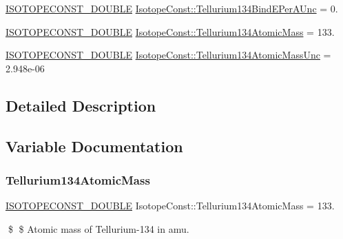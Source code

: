 \begin{DoxyCompactItemize}
\mbox{\hyperlink{group___isotope_const-_macros_ga8f45a7272ce02c0b4c65c44636ed719a}{I\+S\+O\+T\+O\+P\+E\+C\+O\+N\+S\+T\+\_\+\+D\+O\+U\+B\+LE}} \mbox{\hyperlink{group___isotope_const-_tellurium-_te134_gaa8f267539ad4679cb81058860f0d3d57}{Isotope\+Const\+::\+Tellurium134\+Bind\+E\+Per\+A\+Unc}} = 0.
\item 
\mbox{\hyperlink{group___isotope_const-_macros_ga8f45a7272ce02c0b4c65c44636ed719a}{I\+S\+O\+T\+O\+P\+E\+C\+O\+N\+S\+T\+\_\+\+D\+O\+U\+B\+LE}} \mbox{\hyperlink{group___isotope_const-_tellurium-_te134_gae786c89fd5e52adfd981155d974ee502}{Isotope\+Const\+::\+Tellurium134\+Atomic\+Mass}} = 133.
\item 
\mbox{\hyperlink{group___isotope_const-_macros_ga8f45a7272ce02c0b4c65c44636ed719a}{I\+S\+O\+T\+O\+P\+E\+C\+O\+N\+S\+T\+\_\+\+D\+O\+U\+B\+LE}} \mbox{\hyperlink{group___isotope_const-_tellurium-_te134_ga3adbcfa8d69bac630e56ff37b044c3db}{Isotope\+Const\+::\+Tellurium134\+Atomic\+Mass\+Unc}} = 2.\+948e-\/06
\end{DoxyCompactItemize}


\subsection{Detailed Description}


\subsection{Variable Documentation}
\mbox{\label{group___isotope_const-_tellurium-_te134_gae786c89fd5e52adfd981155d974ee502}} 
\subsubsection{\texorpdfstring{Tellurium134\+Atomic\+Mass}{Tellurium134AtomicMass}}
{\footnotesize\ttfamily \mbox{\hyperlink{group___isotope_const-_macros_ga8f45a7272ce02c0b4c65c44636ed719a}{I\+S\+O\+T\+O\+P\+E\+C\+O\+N\+S\+T\+\_\+\+D\+O\+U\+B\+LE}} Isotope\+Const\+::\+Tellurium134\+Atomic\+Mass = 133.}

\$ \$ Atomic mass of Tellurium-\/134 in amu. \mbox{\label{group___isotope_const-_tellurium-_te134_ga3adbcfa8d69bac630e56ff37b044c3db}} 
